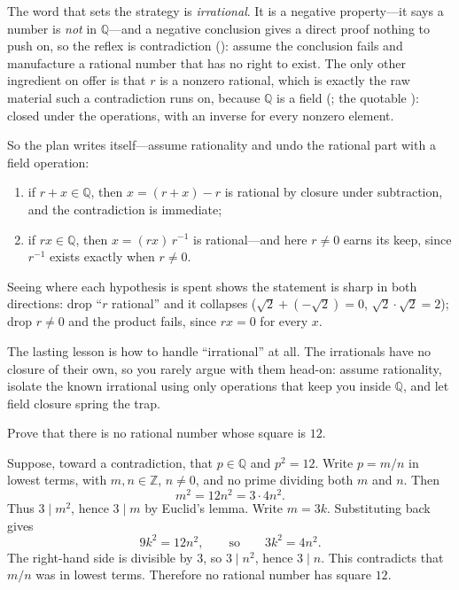 \documentclass[main.tex]{subfiles}
\begin{document}
\begin{Reflection}
The word that sets the strategy is \emph{irrational}. It is a negative property---it says a number is
\emph{not} in $\mathbb Q$---and a negative conclusion gives a direct proof nothing to push on, so the
reflex is contradiction (): assume the conclusion fails and manufacture a rational number
that has no right to exist. The only other ingredient on offer is that $r$ is a nonzero rational, which
is exactly the raw material such a contradiction runs on, because $\mathbb Q$ is a field
(; the quotable ): closed
under the operations, with an inverse for every nonzero element.

So the plan writes itself---assume rationality and undo the rational part with a field operation:
\begin{enumerate}[leftmargin=1.7em,itemsep=3pt,topsep=2pt,label=\textnormal{(\arabic*)}]
  \item if $r+x\in\mathbb Q$, then $x=(r+x)-r$ is rational by closure under subtraction, and the
        contradiction is immediate;
  \item if $rx\in\mathbb Q$, then $x=(rx)\,r^{-1}$ is rational---and here $r\neq 0$ earns its keep,
        since $r^{-1}$ exists exactly when $r\neq 0$.
\end{enumerate}

Seeing where each hypothesis is spent shows the statement is sharp in both directions: drop ``$r$
rational'' and it collapses ($\sqrt2+(-\sqrt2)=0$, $\sqrt2\cdot\sqrt2=2$); drop $r\neq 0$ and the
product fails, since $rx=0$ for every $x$.

The lasting lesson is how to handle ``irrational'' at all. The irrationals have no closure of their
own, so you rarely argue with them head-on: assume rationality, isolate the known irrational using only
operations that keep you inside $\mathbb Q$, and let field closure spring the trap.
\end{Reflection}

Prove that there is no rational number whose square is $12$.

\begin{SolutionBlue}
Suppose, toward a contradiction, that $p\in\mathbb Q$ and $p^2=12$. Write $p=m/n$ in lowest terms,
with $m,n\in\mathbb Z$, $n\neq 0$, and no prime dividing both $m$ and $n$. Then
\[
m^2=12n^2=3\cdot 4n^2.
\]
Thus $3\mid m^2$, hence $3\mid m$ by Euclid's lemma. Write $m=3k$. Substituting back gives
\[
9k^2=12n^2,\qquad\text{so}\qquad 3k^2=4n^2.
\]
The right-hand side is divisible by $3$, so $3\mid n^2$, hence $3\mid n$. This contradicts that
$m/n$ was in lowest terms. Therefore no rational number has square $12$.
\end{SolutionBlue}
\end{document}
